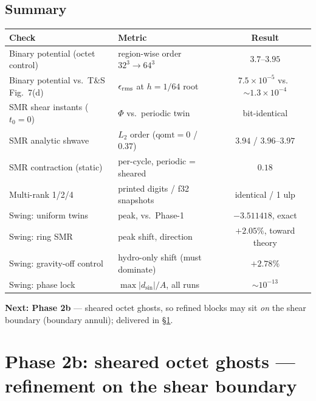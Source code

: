 \documentclass[11pt]{article}
\begin{document}
\subsection{Summary}
\begin{center}
\small
\begin{tabular}{@{}llc@{}}
\toprule
Check & Metric & Result \\
\midrule
Binary potential (octet control) & region-wise order $32^3{\to}64^3$ & $3.7$--$3.95$ \\
Binary potential vs.\ T\&S Fig.~7(d) & $\epsilon_{\rm rms}$ at $h{=}1/64$ root & $7.5\times10^{-5}$ vs.\ ${\sim}1.3\times10^{-4}$ \\
SMR shear instants ($t_0 = 0$) & $\Phi$ vs.\ periodic twin & bit-identical \\
SMR analytic shwave & $L_2$ order ($\mathrm{qomt}{=}0$ / $0.37$) & $3.94$ / $3.96$--$3.97$ \\
SMR contraction (static) & per-cycle, periodic = sheared & $0.18$ \\
Multi-rank 1/2/4 & printed digits / f32 snapshots & identical / 1 ulp \\
Swing: uniform twins & peak, vs.\ Phase-1 & $-3.511418$, exact \\
Swing: ring SMR & peak shift, direction & $+2.05\%$, toward theory \\
Swing: gravity-off control & hydro-only shift (must dominate) & $+2.78\%$ \\
Swing: phase lock & $\max|d_{\sin}|/A$, all runs & ${\sim}10^{-13}$ \\
\bottomrule
\end{tabular}
\end{center}

\noindent\textbf{Next: Phase 2b} --- sheared octet ghosts, so refined blocks may sit
\emph{on} the shear boundary (boundary annuli); delivered in \S\ref{sec:phase2b}.

\section{Phase 2b: sheared octet ghosts --- refinement on the shear boundary}
\label{sec:phase2b}
\end{document}
